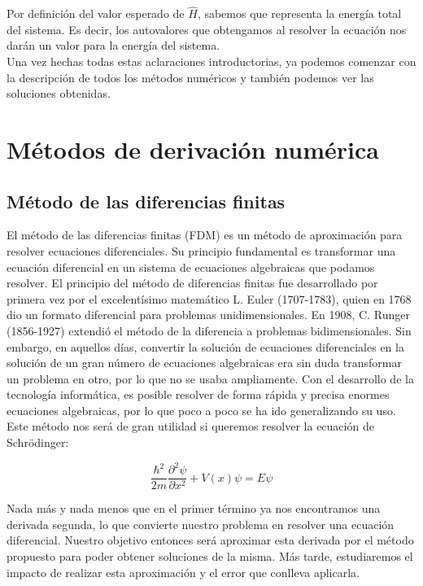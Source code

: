\documentclass[12pt]{article}
\begin{document}
Por definición del valor esperado de $\hat{H}$, sabemos que representa la  energía total del sistema. Es decir, los autovalores que obtengamos al resolver la ecuación nos darán un valor para la energía del sistema. \\

Una vez hechas todas estas aclaraciones introductorias, ya podemos
comenzar con la descripción de todos los métodos numéricos y 
también podemos ver las soluciones obtenidas.

\newpage
\section{Métodos de derivación numérica}

\subsection{Método de las diferencias finitas}

El método de las diferencias finitas (FDM) es un método de aproximación para resolver ecuaciones diferenciales. Su principio fundamental es transformar una ecuación diferencial en un sistema de ecuaciones algebraicas que podamos resolver. El principio del método de diferencias finitas fue desarrollado por primera vez por el excelentísimo matemático L. Euler (1707-1783), quien en 1768 dio un formato diferencial para problemas unidimensionales. En 1908, C. Runger (1856-1927) extendió el método de la diferencia a problemas bidimensionales. Sin embargo, en aquellos días, convertir la solución de ecuaciones diferenciales en la solución de un gran número de ecuaciones algebraicas era sin duda transformar un problema en otro, por lo que no se usaba ampliamente. Con el desarrollo de la tecnología informática, es posible resolver de forma rápida y precisa enormes ecuaciones algebraicas, por lo que poco a poco se ha ido generalizando su uso.\\

Este método nos será de gran utilidad si queremos resolver la ecuación de Schrödinger:

\begin{equation*}
\frac{\hbar^2}{2m} \frac{\partial^2\psi}{\partial x^2} + V(x)\psi = E \psi
\end{equation*}

Nada más y nada menos que en el primer término ya nos encontramos una derivada segunda, lo que convierte nuestro problema en resolver una ecuación diferencial. Nuestro objetivo entonces será aproximar esta derivada por el método propuesto para poder obtener soluciones de la misma. Más tarde, estudiaremos el impacto de realizar esta aproximación y el error que conlleva aplicarla.\\
\end{document}
